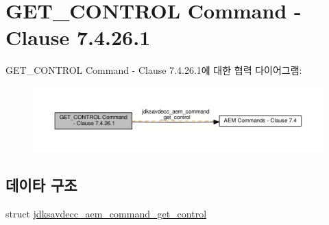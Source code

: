 \hypertarget{group__command__get__control}{}\section{G\+E\+T\+\_\+\+C\+O\+N\+T\+R\+OL Command -\/ Clause 7.4.26.1}
\label{group__command__get__control}
G\+E\+T\+\_\+\+C\+O\+N\+T\+R\+OL Command -\/ Clause 7.4.26.1에 대한 협력 다이어그램\+:
\nopagebreak
\begin{figure}[H]
\begin{center}
\leavevmode
\includegraphics[width=350pt]{group__command__get__control}
\end{center}
\end{figure}
\subsection*{데이타 구조}
\begin{DoxyCompactItemize}
\item 
struct \hyperlink{structjdksavdecc__aem__command__get__control}{jdksavdecc\+\_\+aem\+\_\+command\+\_\+get\+\_\+control}
\end{DoxyCompactItemize}
